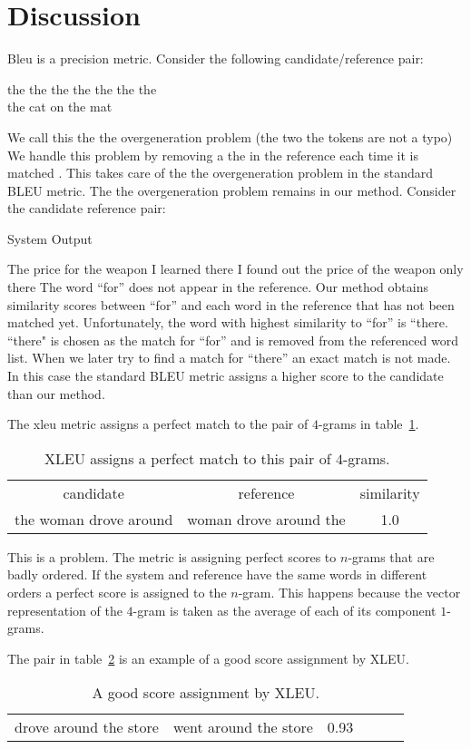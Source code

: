 
\section{Discussion}
\label{sec:discuss}

Bleu is a precision metric. 
Consider the following candidate/reference pair:
\begin{center}
  the the the the the the the \\
the cat on the mat
\end{center}

We call this the  the overgeneration problem (the two the tokens are not a typo)
We handle this problem by removing a the in the reference each time it is matched . 
This takes care of the the overgeneration problem in the standard BLEU metric. 
The the overgeneration problem remains in our method. 
Consider the candidate reference pair:
\begin{description}
\item[System Output] 
\end{description}
The price for the weapon I learned there
I found out the price of the weapon only there
The word ``for'' does not appear in the reference. 
Our method obtains similarity scores between ``for'' and each word in the reference that has not been matched yet. 
Unfortunately, the word with highest similarity to ``for'' is ``there. 
``there" is chosen as the match for ``for'' and is removed from the referenced word list. 
When we later try to find a match for ``there'' an exact match is not made. 
In this case the standard BLEU metric assigns a higher score to the candidate than our method. 

The xleu metric assigns a perfect match to the pair of $4$-grams in table~\ref{tab:perfect}. 
\begin{table}[h]
  \centering
  \begin{tabular}{|c|c|c|}
    candidate & reference & similarity \\
the woman drove around & woman drove around the & 1.0 
  \end{tabular}
  \caption{XLEU assigns a perfect match to this pair of $4$-grams.}
  \label{tab:perfect}
\end{table}

This is a problem. 
The metric is assigning perfect scores to $n$-grams that are  badly ordered. 
If the system and reference have the same words in different orders a perfect score is assigned to the $n$-gram.
This happens because the vector representation of the $4$-gram is taken as the average of each of its component $1$-grams. 

The pair in table~\ref{tab:good} is an example of a good score assignment by XLEU. 

\begin{table}[hh]
  \centering
  \begin{tabular}{|c|c|c||c|c|c|}
    drove around the store & went around the store & 0.93 
  \end{tabular}
  \caption{A good score assignment by XLEU.}
  \label{tab:good}
\end{table}
